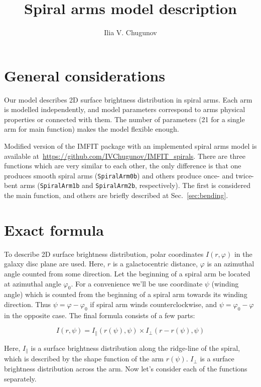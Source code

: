 \documentclass[12pt,a4paper]{article}
\title{Spiral arms model description}
\author{Ilia V. Chugunov}
\begin{document}
	
\maketitle
	
\section{General considerations}
Our model describes 2D surface brightness distribution in spiral arms. Each arm is modelled independently, and model parameters correspond to arms physical properties or connected with them. The number of parameters (21 for a single arm for main function) makes the model flexible enough.

Modified version of the IMFIT package with an implemented spiral arms model is available at~\url{https://github.com/IVChugunov/IMFIT_spirals}. There are three functions which are very similar to each other, the only difference is that one produces smooth spiral arms (\verb*|SpiralArm0b|) and others produce once- and twice-bent arms (\verb*|SpiralArm1b| and \verb*|SpiralArm2b|, respectively). The first is considered the main function, and others are briefly described at Sec.~\ref{sec:bending}.

\section{Exact formula}
To describe 2D surface brightness distribution, polar coordinates $I(r, \varphi)$ in the galaxy disc plane are used. Here, $r$ is a galactocentric distance, $\varphi$ is an azimuthal angle counted from some direction. Let the beginning of a spiral arm be located at azimuthal angle $\varphi_0$. For a convenience we'll be use coordinate $\psi$ (winding angle) which is counted from the beginning of a spiral arm towards its winding direction. Thus $\psi = \varphi - \varphi_0$ if spiral arm winds counterclockwise, and $\psi = \varphi_0 - \varphi$ in the opposite case. The final formula consists of a few parts:

\begin{equation}
	I(r, \psi) = I_\parallel(r(\psi), \psi) \times I_\bot(r - r(\psi), \psi)
\end{equation}

Here, $I_\parallel$ is a surface brightness distribution along the ridge-line of the spiral, which is described by the shape function of the arm $r(\psi)$. $I_\bot$ is a surface brightness distribution across the arm. Now let's consider each of the functions separately.
\end{document}
